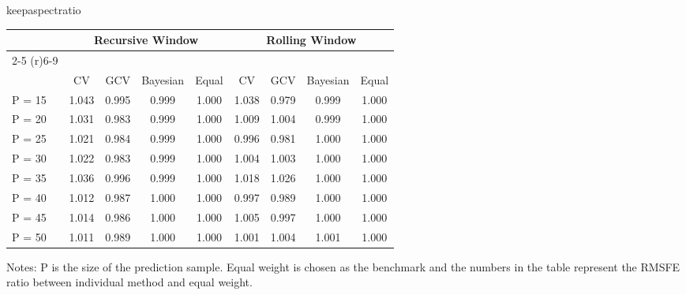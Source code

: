 \begin{sidewaystable}
\caption{Model~\ref{md:2}}
\centering
\begin{adjustbox}{keepaspectratio}
\begin{threeparttable}
\begin{tabular}{lcccccccc}
\toprule
 & \multicolumn{4}{c}{Recursive Window} & \multicolumn{4}{c}{Rolling Window}\\%
\cmidrule(r){2-5}
\cmidrule(r){6-9}\\
       & CV & GCV & Bayesian & Equal & CV & GCV & Bayesian & Equal \\
P = 15 &1.043 &0.995 &0.999 & 1.000& 1.038& 0.979& 0.999& 1.000\\
P = 20 &1.031 &0.983 &0.999 & 1.000& 1.009& 1.004& 0.999& 1.000\\
P = 25 &1.021 &0.984 &0.999 & 1.000& 0.996& 0.981& 1.000& 1.000\\
P = 30 &1.022 &0.983 &0.999 & 1.000& 1.004& 1.003& 1.000& 1.000\\
P = 35 &1.036 &0.996 &0.999 & 1.000& 1.018& 1.026& 1.000& 1.000\\
P = 40 &1.012 &0.987 &1.000 & 1.000& 0.997& 0.989& 1.000& 1.000\\
P = 45 &1.014 &0.986 &1.000 & 1.000& 1.005& 0.997& 1.000& 1.000\\
P = 50 &1.011 &0.989 &1.000 & 1.000& 1.001& 1.004& 1.001& 1.000\\
\bottomrule
\end{tabular}
\begin{tablenotes} \footnotesize
Notes: $\mathrm{P}$ is the size of the prediction sample. Equal weight is chosen as the benchmark and the numbers in the table represent the RMSFE ratio between individual method and equal weight.
\end{tablenotes}
\end{threeparttable}
\end{adjustbox}
\end{sidewaystable}